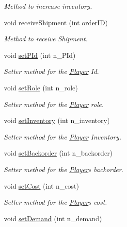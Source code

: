 \begin{DoxyCompactItemize}
\begin{DoxyCompactList}\small\item\em Method to increase inventory. \end{DoxyCompactList}\item 
void \hyperlink{class_player_afd48e4062a9411e1f66cf23809b8c43f}{receive\+Shipment} (int order\+ID)
\begin{DoxyCompactList}\small\item\em Method to receive Shipment. \end{DoxyCompactList}\item 
void \hyperlink{class_player_a534f0e79b1e7a6310f3d02e04b95b4b4}{set\+P\+Id} (int n\+\_\+\+P\+Id)
\begin{DoxyCompactList}\small\item\em Setter method for the \hyperlink{class_player}{Player} Id. \end{DoxyCompactList}\item 
void \hyperlink{class_player_a5def6f94584d296aaba2d620697a8922}{set\+Role} (int n\+\_\+role)
\begin{DoxyCompactList}\small\item\em Setter method for the \hyperlink{class_player}{Player} role. \end{DoxyCompactList}\item 
void \hyperlink{class_player_a279e316b279fcf5e78f395bea0f417f0}{set\+Inventory} (int n\+\_\+inventory)
\begin{DoxyCompactList}\small\item\em Setter method for the \hyperlink{class_player}{Player} Inventory. \end{DoxyCompactList}\item 
void \hyperlink{class_player_a55cf59cc96744fee031167b7736e5d35}{set\+Backorder} (int n\+\_\+backorder)
\begin{DoxyCompactList}\small\item\em Setter method for the \hyperlink{class_player}{Player}\textquotesingle{}s backorder. \end{DoxyCompactList}\item 
void \hyperlink{class_player_adae26798d67d12ad53bd3d9ba2e8b0fc}{set\+Cost} (int n\+\_\+cost)
\begin{DoxyCompactList}\small\item\em Setter method for the \hyperlink{class_player}{Player}\textquotesingle{}s cost. \end{DoxyCompactList}\item 
void \hyperlink{class_player_aba795131e99318dfc9d4fef7de189aac}{set\+Demand} (int n\+\_\+demand)

\end{DoxyCompactItemize}
